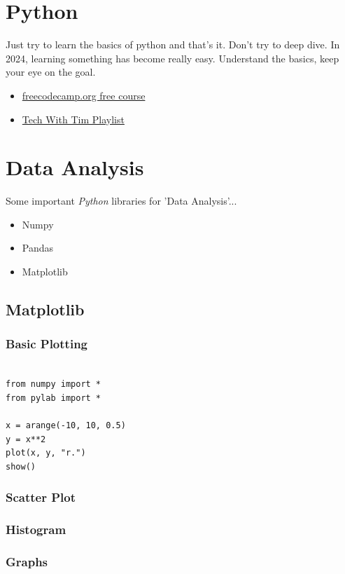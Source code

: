 \documentclass{book}
\begin{document}
\chapter{Python}
Just try to learn the basics of python and that's it. Don't try to deep dive.
In 2024, learning something has become really easy. Understand the basics, keep your eye on the goal.
\begin{itemize}
	\item \href{https://youtu.be/rfscVS0vtbw?si=sfz5vdTybYIppFXz}{freecodecamp.org free course}
	\item \href{https://youtube.com/playlist?list=PLzMcBGfZo4-mFu00qxl0a67RhjjZj3jXm&si=2mE3gQfgFJAjnbJ3}{Tech With Tim Playlist}
\end{itemize}
\chapter{Data Analysis}
Some important \textit{Python} libraries for 'Data Analysis'...
\begin{itemize}
	\item Numpy
	\item Pandas
	\item Matplotlib
\end{itemize}
\section{Matplotlib}
\subsection{Basic Plotting}
\begin{verbatim}
   
from numpy import *
from pylab import *

x = arange(-10, 10, 0.5)
y = x**2
plot(x, y, "r.")
show()
\end{verbatim}
\subsection{Scatter Plot}
\subsection{Histogram}
\subsection{Graphs}
\end{document}
